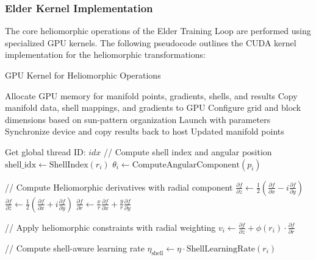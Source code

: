 \subsubsection{Elder Kernel Implementation}

The core heliomorphic operations of the Elder Training Loop are performed using specialized GPU kernels. The following pseudocode outlines the CUDA kernel implementation for the heliomorphic transformations:

\begin{algorithm}
\caption{GPU Kernel for Heliomorphic Operations}
\begin{algorithmic}[1]
    \State Allocate GPU memory for manifold points, gradients, shells, and results
    \State Copy manifold data, shell mappings, and gradients to GPU
    \State Configure grid and block dimensions based on sun-pattern organization
    \State Launch  with parameters
    \State Synchronize device and copy results back to host
    \State \Return Updated manifold points
\EndFunction

\State

    \State Get global thread ID: $idx$
        \State // Compute shell index and angular position
        \State $\text{shell\_idx} \gets \text{ShellIndex}(r_i)$
        \State $\theta_i \gets \text{ComputeAngularComponent}(p_i)$
        
        \State // Compute Heliomorphic derivatives with radial component
        \State $\frac{\partial f}{\partial z} \gets \frac{1}{2}\left(\frac{\partial f}{\partial x} - i\frac{\partial f}{\partial y}\right)$
        \State $\frac{\partial f}{\partial \bar{z}} \gets \frac{1}{2}\left(\frac{\partial f}{\partial x} + i\frac{\partial f}{\partial y}\right)$
        \State $\frac{\partial f}{\partial r} \gets \frac{x}{r}\frac{\partial f}{\partial x} + \frac{y}{r}\frac{\partial f}{\partial y}$
        
        \State // Apply heliomorphic constraints with radial weighting
        \State $v_i \gets \frac{\partial f}{\partial z} + \phi(r_i) \cdot \frac{\partial f}{\partial r}$
        
        \State // Compute shell-aware learning rate
        \State $\eta_{\text{shell}} \gets \eta \cdot \text{ShellLearningRate}(r_i)$
        

\end{algorithmic}
\end{algorithm}
